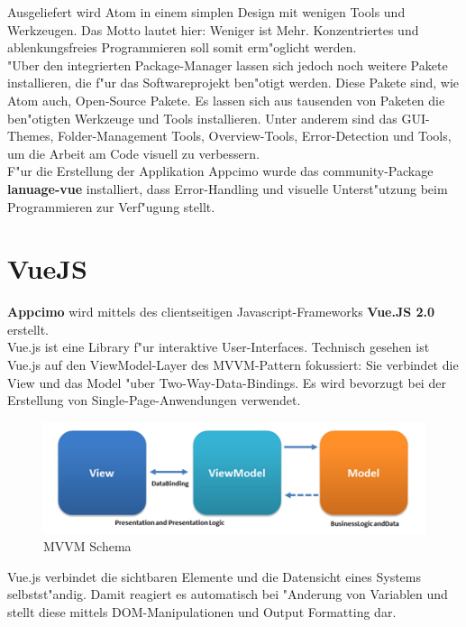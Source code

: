 \documentclass[a4paper, 11pt]{scrreprt}
\begin{document}
Ausgeliefert wird Atom in einem simplen Design mit wenigen Tools und Werkzeugen. Das Motto lautet hier: Weniger ist Mehr. Konzentriertes und ablenkungsfreies Programmieren soll somit erm"oglicht werden. \\"Uber den integrierten Package-Manager lassen sich jedoch noch weitere Pakete installieren, die f"ur das Softwareprojekt ben"otigt werden. Diese Pakete sind, wie Atom auch, Open-Source Pakete. Es lassen sich aus tausenden von Paketen die ben"otigten Werkzeuge und Tools installieren. Unter anderem sind das GUI-Themes, Folder-Management Tools, Overview-Tools, Error-Detection und Tools, um die Arbeit am Code visuell zu verbessern.\\

F"ur die Erstellung der Applikation Appcimo wurde das community-Package \textbf{lanuage-vue} installiert, dass Error-Handling und visuelle Unterst"utzung beim Programmieren zur Verf"ugung stellt.


\section{VueJS}
\textbf{Appcimo} wird mittels des clientseitigen Javascript-Frameworks \textbf{Vue.JS 2.0} erstellt. \\

Vue.js ist eine Library f"ur interaktive User-Interfaces. Technisch gesehen ist Vue.js auf den ViewModel-Layer des MVVM-Pattern fokussiert: Sie verbindet die View und das Model "uber Two-Way-Data-Bindings. Es wird bevorzugt bei der Erstellung von Single-Page-Anwendungen verwendet.

\begin{figure} [h]
\begin{center}


\includegraphics[width=12cm]{mvvm.png}
\caption{MVVM Schema}
\label{mvvm}

\end{center}
\end{figure}

Vue.js verbindet die sichtbaren Elemente und die Datensicht eines Systems selbstst"andig. Damit reagiert es automatisch bei "Anderung von Variablen und  stellt diese mittels DOM-Manipulationen und Output Formatting dar.\\
\end{document}

